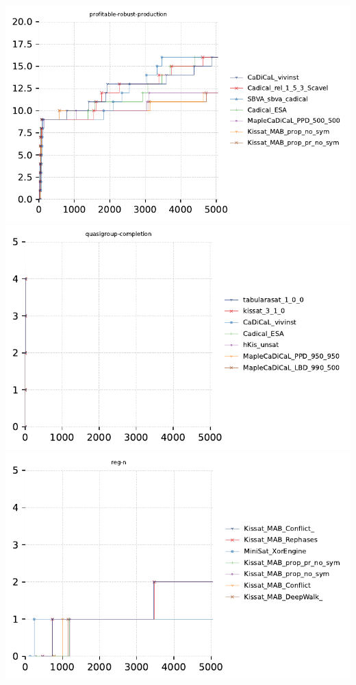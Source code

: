\documentclass{article}
\begin{document}
\includegraphics[width=\linewidth]{gen/sc2023/cdfs/cdf-profitable-robust-production.pdf}
\includegraphics[width=\linewidth]{gen/sc2023/cdfs/cdf-quasigroup-completion.pdf}
\includegraphics[width=\linewidth]{gen/sc2023/cdfs/cdf-reg-n.pdf}
\end{document}
